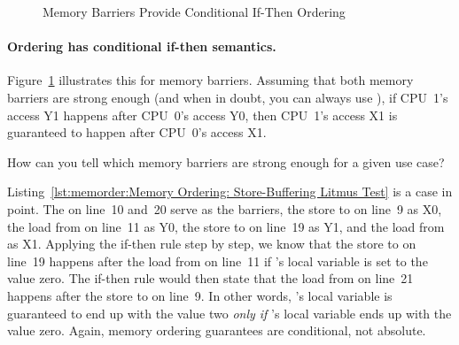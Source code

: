 \begin{figure}[htb]
\centering
{}
\caption{Memory Barriers Provide Conditional If-Then Ordering}
\label{fig:memorder:Memory Barriers Provide Conditional If-Then Ordering}
\end{figure}

\paragraph{Ordering has conditional if-then semantics.}
Figure~\ref{fig:memorder:Memory Barriers Provide Conditional If-Then Ordering}
illustrates this for memory barriers.
Assuming that both memory barriers are strong enough (and when in doubt, you
can always use ), if CPU~1's access Y1 happens after CPU~0's
access Y0, then CPU~1's access X1 is guaranteed to happen after CPU~0's
access X1.

\QuickQuiz{}
	How can you tell which memory barriers are strong enough for
	a given use case?
 \QuickQuizEnd

Listing~\ref{lst:memorder:Memory Ordering: Store-Buffering Litmus Test}
is a case in point.
The  on line~10 and~20 serve as the barriers,
the store to  on line~9 as X0, the load from  on line~11
as Y0, the store to  on line~19 as Y1, and the load from
 as X1.
Applying the if-then rule step by step, we know that the store to
 on line~19 happens after the load from  on line~11 if
's local variable  is set to the value zero.
The if-then rule would then state that the load from  on
line~21 happens after the store to  on line~9.
In other words,
's local variable  is guaranteed
to end up with the value two \emph{only if}
's local variable  ends up with the value zero.
Again, memory ordering guarantees are conditional, not absolute.

